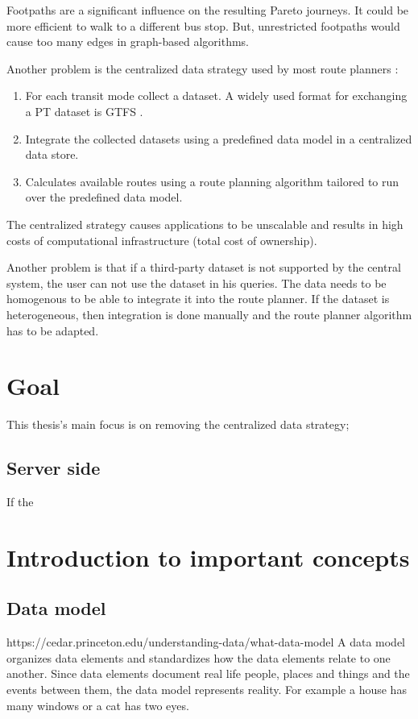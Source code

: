 Footpaths are a significant influence on the resulting Pareto journeys. It could be more efficient to walk to a different bus stop. But, unrestricted footpaths would cause too many edges in graph-based algorithms.

Another problem is the centralized data strategy used by most route planners \cite{rojas_melendez_julian_andres_decentralized_2020}:
\begin{enumerate}
    \item For each transit mode collect a dataset. A widely used format for exchanging a PT dataset is GTFS \cite{noauthor_gtfs_2022}.
    \item Integrate the collected datasets using a predefined data model in a centralized data store.
    \item Calculates available routes using a route planning algorithm tailored to run over the predefined data model.
\end{enumerate}

The centralized strategy causes applications to be unscalable and results in high costs of computational infrastructure (total cost of ownership). 

Another problem is that if a third-party dataset is not supported by the central system, the user can not use the dataset in his queries. The data needs to be homogenous to be able to integrate it into the route planner. If the dataset is heterogeneous, then integration is done manually and the route planner algorithm has to be adapted.
\section{Goal}

This thesis's main focus is on removing the centralized data strategy;
\subsection{Server side}
If the 
\section{Introduction to important concepts}
\subsection{Data model}
https://cedar.princeton.edu/understanding-data/what-data-model
A data model organizes data elements and standardizes how the data elements relate to one another. Since data elements document real life people, places and things and the events between them, the data model represents reality. For example a house has many windows or a cat has two eyes.

